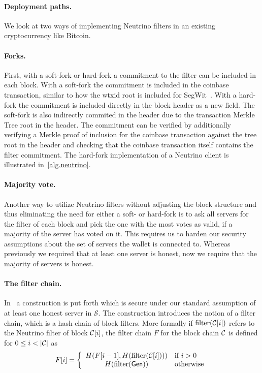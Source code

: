 \paragraph{Deployment paths.}
We look at two ways of implementing Neutrino filters in an existing cryptocurrency like Bitcoin.

\paragraph{Forks.}
First, with a soft-fork or hard-fork a commitment to the filter can be included in each block. With a soft-fork the commitment is included in the coinbase transaction, similar to how the wtxid root is included for SegWit~\cite{segwit}. With a hard-fork the commitment is included directly in the block header as a new field. The soft-fork is also indirectly commited in the header due to the transaction Merkle Tree root in the header. The commitment can be verified by additionally verifying a Merkle proof of inclusion for the coinbase transaction against the tree root in the header and checking that the coinbase transaction itself contains the filter commitment. The hard-fork implementation of a Neutrino client is illustrated in~\cref{alg.neutrino}.

\paragraph{Majority vote.}
Another way to utilize Neutrino filters without adjusting the block structure and thus eliminating the need for either a soft- or hard-fork is to ask all servers for the filter of each block and pick the one with the most votes as valid, if a majority of the server has voted on it. This requires us to harden our security assumptions about the set of servers the wallet is connected to. Whereas previously we required that at least one server is honest, now we require that the majority of servers is honest.

\paragraph{The filter chain.}
\def\fltr{\text{filter}}
In~\cite{bip157} a construction is put forth which is secure under our standard assumption of at least one honest server in $\mathcal{S}$. The construction introduces the notion of a filter chain, which is a hash chain of block filters. More formally if $\fltr(\chain[i])$ refers to the Neutrino filter of block $\mathcal{C}[i]$, the filter chain $F$ for the block chain $\mathcal{C}$ is defined for $0 \le i < |\mathcal{C}|$ as
\[
F[i] = \left\{
    \begin{array}{cl}
        H(F[i-1], H(\fltr(\chain[i]))) & \text{if } i > 0 \\
        H(\fltr(\Gen)) & \text{otherwise}
    \end{array}
\right.
\]

